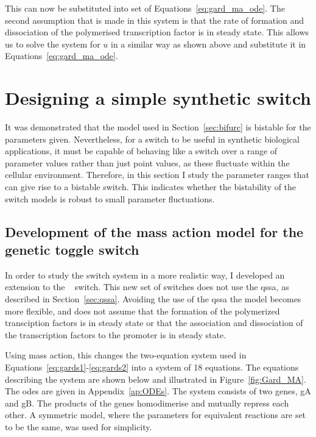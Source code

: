 \noindent This can now be substituted into set of Equations~\ref{eq:gard_ma_ode}. The second assumption that is made in this system is that the rate of formation and dissociation of the polymerised transcription factor is in steady state. This allows us to solve the system for $u$ in a similar way as shown above and substitute it in Equations~\ref{eq:gard_ma_ode}.

\section{Designing a simple synthetic switch}
\label{sec:design_sim}

It was demonstrated that the model used in Section~\ref{sec:bifurc} is bistable for the parameters given. Nevertheless, for a switch to be useful in synthetic biological applications, it must be capable of behaving like a switch over a range of parameter values rather than just point values, as these fluctuate within the cellular environment. Therefore, in this section I study the parameter ranges that can give rise to a bistable switch. This indicates whether the bistability of the switch models is robust to small parameter fluctuations.


\subsection{Development of the mass action model for the genetic toggle switch}

In order to study the switch system in a more realistic way, I developed an extension to the ~\textcite{Gardner:2000vha} switch. This new set of switches does not use the \acrfull{qssa}, as described in Section~\ref{sec:qssa}. Avoiding the use of the \acrshort{qssa} the model becomes more flexible, and does not assume that the formation of the polymerized transciption factors is in steady state or that the association and dissociation of the transcription factors to the promoter is in steady state.  

Using mass action, this changes the two-equation system used in Equations~\ref{eq:gards1}-\ref{eq:gards2} into a system of 18 equations. The equations describing the system are shown below and illustrated in Figure~\ref{fig:Gard_MA}. The \acrshort{ode}s are given in Appendix~\ref{ap:ODEs}. The system consists of two genes, gA and gB. The products of the genes homodimerise and mutually repress each other. A symmetric model, where the parameters for equivalent reactions are set to be the same, was used for simplicity.

